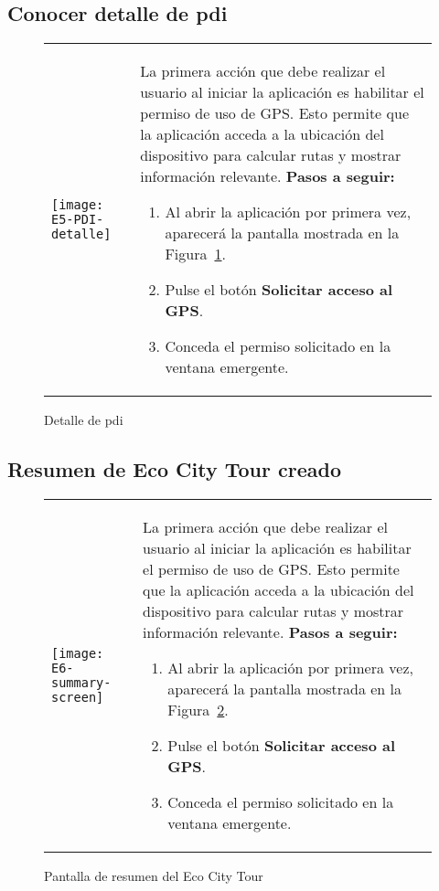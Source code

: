 \subsection{Conocer detalle de \acrshort{pdi}}
\begin{figure}[h!]
	\centering
	\begin{tabular}{m{} m{}}
		\texttt{[image: E5-PDI-detalle]} & 
		\vspace{-10pt}
		
		La primera acción que debe realizar el usuario al iniciar la aplicación es habilitar el permiso de uso de GPS. Esto permite que la aplicación acceda a la ubicación del dispositivo para calcular rutas y mostrar información relevante.
		\textbf{Pasos a seguir:}
		\begin{enumerate}
			\item Al abrir la aplicación por primera vez, aparecerá la pantalla mostrada en la Figura~\ref{fig:detallePDI}.
			\item Pulse el botón \textbf{Solicitar acceso al GPS}.
			\item Conceda el permiso solicitado en la ventana emergente.
		\end{enumerate}		
	\end{tabular}
	\caption{Detalle de \acrshort{pdi}}
	\label{fig:detallePDI}
\end{figure}

\subsection{Resumen de Eco City Tour creado}
\begin{figure}[h!]
	\centering
	\begin{tabular}{m{} m{}}
		\texttt{[image: E6-summary-screen]} & 
		\vspace{-10pt}
		
		La primera acción que debe realizar el usuario al iniciar la aplicación es habilitar el permiso de uso de GPS. Esto permite que la aplicación acceda a la ubicación del dispositivo para calcular rutas y mostrar información relevante.
		\textbf{Pasos a seguir:}
		\begin{enumerate}
			\item Al abrir la aplicación por primera vez, aparecerá la pantalla mostrada en la Figura~\ref{fig:resumenECT}.
			\item Pulse el botón \textbf{Solicitar acceso al GPS}.
			\item Conceda el permiso solicitado en la ventana emergente.
		\end{enumerate}		
	\end{tabular}
	\caption{Pantalla de resumen del Eco City Tour}
	\label{fig:resumenECT}
\end{figure}

